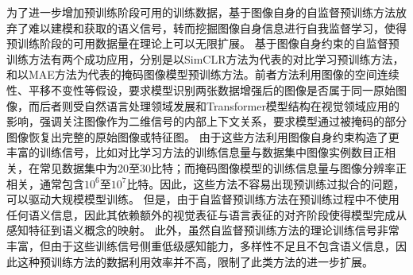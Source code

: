 为了进一步增加预训练阶段可用的训练数据，基于图像自身的自监督预训练方法放弃了难以建模和获取的语义信号，转而挖掘图像自身信息进行自我监督学习，使得预训练阶段的可用数据量在理论上可以无限扩展。
基于图像自身约束的自监督预训练方法有两个成功应用，分别是以SimCLR方法\cite{chen2020simple}为代表的对比学习预训练方法，和以MAE方法\cite{he2022masked}为代表的掩码图像模型预训练方法。前者方法利用图像的空间连续性、平移不变性等假设，要求模型识别两张数据增强后的图像是否属于同一原始图像\cite{moco,byol,dino}，而后者则受自然语言处理领域发展\cite{BERT,gpt2}和Transformer模型结构在视觉领域应用\cite{dosovitskiy2020vit}的影响，强调关注图像作为二维信号的内部上下文关系，要求模型通过被掩码的部分图像恢复出完整的原始图像或特征图\cite{ImageGPT,bao2021beit,xie2022simmim,baevski2022data2vec}。
由于这些方法利用图像自身约束构造了更丰富的训练信号，比如对比学习方法的训练信息量与数据集中图像实例数目正相关，在常见数据集中为20至30比特；而掩码图像模型的训练信息量与图像分辨率正相关，通常包含$10^6$至$10^7$比特。因此，这些方法不容易出现预训练过拟合的问题，可以驱动大规模模型训练。
但是，由于自监督预训练方法在预训练过程中不使用任何语义信息，因此其依赖额外的视觉表征与语言表征的对齐阶段使得模型完成从感知特征到语义概念的映射。
此外，虽然自监督预训练方法的理论训练信号非常丰富，但由于这些训练信号侧重低级感知能力，多样性不足且不包含语义信息，因此这种预训练方法的数据利用效率并不高\cite{SEER, xie2023data}，限制了此类方法的进一步扩展。


